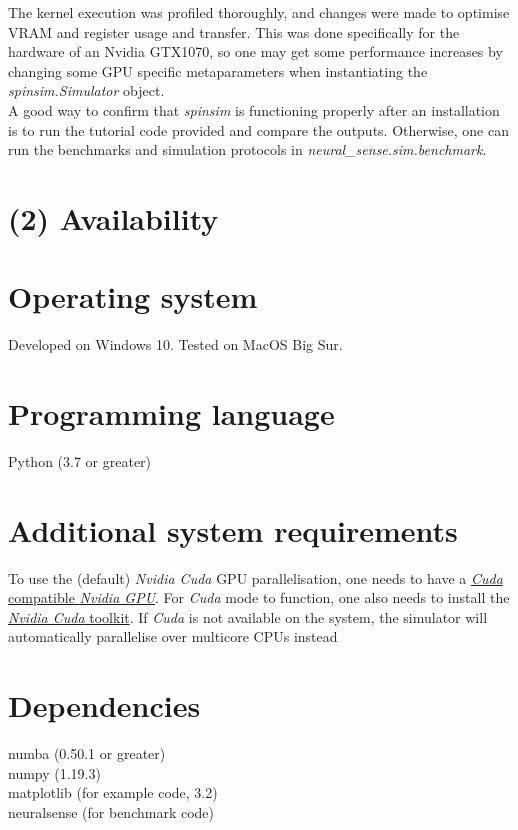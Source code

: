 \documentclass{jors}
\begin{document}
		The kernel execution was profiled thoroughly, and changes were made to optimise VRAM and register usage and transfer. This was done specifically for the hardware of an Nvidia GTX1070, so one may get some performance increases by changing some GPU specific metaparameters when instantiating the \emph{spinsim.Simulator} object.\\

		A good way to confirm that \emph{spinsim} is functioning properly after an installation is to run the tutorial code provided and compare the outputs. Otherwise, one can run the benchmarks and simulation protocols in \emph{neural\_sense.sim.benchmark}.

\section*{(2) Availability}
\vspace{0.5cm}
\section*{Operating system}
Developed on Windows 10. Tested on MacOS Big Sur.

\section*{Programming language}
Python (3.7 or greater)

\section*{Additional system requirements}
To use the (default) \emph{Nvidia Cuda} GPU parallelisation, one needs to have a \href{https://developer.nvidia.com/cuda-gpus}{\emph{Cuda} compatible \emph{Nvidia GPU}}. For \emph{Cuda} mode to function, one also needs to install the \href{https://developer.nvidia.com/cuda-toolkit}{\emph{Nvidia Cuda} toolkit}. If \emph{Cuda} is not available on the system, the simulator will automatically parallelise over multicore CPUs instead

\section*{Dependencies}
numba (0.50.1 or greater)\\
numpy (1.19.3)\\
matplotlib (for example code, 3.2)\\
neuralsense (for benchmark code)
\end{document}
